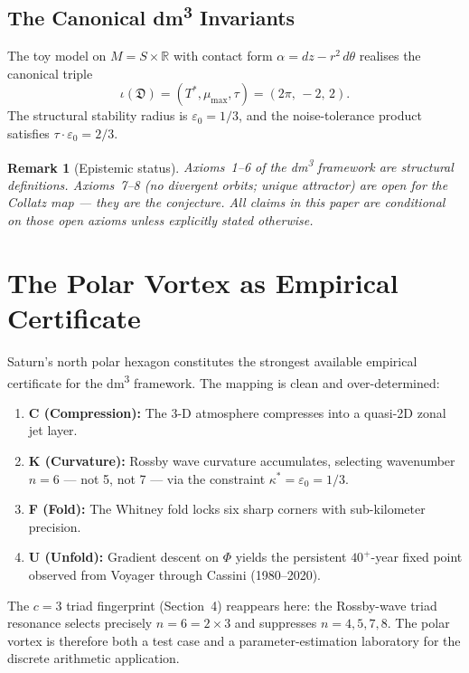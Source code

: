 \documentclass[11pt,a4paper]{article}
\newtheorem{remark}[theorem]{Remark}
\begin{document}
\subsection{The Canonical dm\textsuperscript{3} Invariants}

The toy model on $M = S \times \mathbb{R}$ with contact form
$\alpha = dz - r^2\,d\theta$ realises the canonical triple
\[
  \iota(\mathfrak{D}) = (T^*, \mu_{\max}, \tau) = (2\pi,\,-2,\,2).
\]
The structural stability radius is $\varepsilon_0 = 1/3$, and the
noise-tolerance product satisfies $\tau \cdot \varepsilon_0 = 2/3$.

\begin{remark}[Epistemic status]
Axioms~1--6 of the dm\textsuperscript{3} framework are structural
definitions.  Axioms~7--8 (no divergent orbits; unique attractor) are
open for the Collatz map — they \emph{are} the conjecture.
All claims in this paper are conditional on those open axioms unless
explicitly stated otherwise.
\end{remark}

\section{The Polar Vortex as Empirical Certificate}

Saturn's north polar hexagon constitutes the strongest available
empirical certificate for the dm\textsuperscript{3} framework.
The mapping is clean and over-determined:

\begin{enumerate}
  \item \textbf{C (Compression):} The 3-D atmosphere compresses into a
        quasi-2D zonal jet layer.
  \item \textbf{K (Curvature):} Rossby wave curvature accumulates,
        selecting wavenumber $n = 6$ — not 5, not 7 — via the
        constraint $\kappa^* = \varepsilon_0 = 1/3$.
  \item \textbf{F (Fold):} The Whitney fold locks six sharp corners
        with sub-kilometer precision.
  \item \textbf{U (Unfold):} Gradient descent on $\Phi$ yields the
        persistent $40^+$-year fixed point observed from Voyager through
        Cassini (1980--2020).
\end{enumerate}

The $c = 3$ triad fingerprint (Section~4) reappears here: the
Rossby-wave triad resonance selects precisely $n = 6 = 2 \times 3$
and suppresses $n = 4, 5, 7, 8$.  The polar vortex is therefore both a
test case and a parameter-estimation laboratory for the discrete
arithmetic application.
\end{document}
